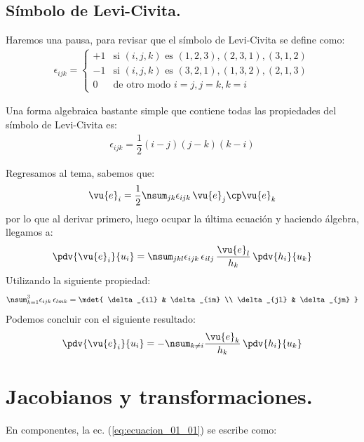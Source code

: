 \subsection*{Símbolo de Levi-Civita.}

Haremos una pausa, para revisar que el símbolo de Levi-Civita se define como:
\begin{align*}
\epsilon_{ijk} = \begin{cases}
+1 & \mbox{si } (i, j, k) \mbox{ es } (1, 2, 3), (2, 3, 1), (3, 1, 2) \\[0.5em]
-1 & \mbox{si } (i, j, k) \mbox{ es } (3, 2, 1), (1, 3, 2), (2, 1, 3) \\[0.5em]
0 & \mbox{de otro modo } i = j, j = k, k = i 
\end{cases}
\end{align*}

Una forma algebraica bastante simple que contiene todas las propiedades del símbolo de Levi-Civita es:
\begin{align*}
\epsilon_{ijk} = \dfrac{1}{2} (i - j) (j - k) (k - i)
\end{align*}

Regresamos al tema, sabemos que:
\begin{align*}
\vu{e}_{i} = \dfrac{1}{2} \nsum_{jk} \epsilon_{ijk} \, \vu{e}_{j} \cp \vu{e}_{k}
\end{align*}
por lo que al derivar primero, luego ocupar la última ecuación y haciendo álgebra, llegamos a:
\begin{align*}
\pdv{\vu{e}_{i}}{u_{i}} = \nsum_{jkl} \epsilon_{ijk} \, \epsilon_{ilj} \, \dfrac{\vu{e}_{l}}{h_{k}} \, \pdv{h_{i}}{u_{k}}
\end{align*}
Utilizando la siguiente propiedad:
\begin{align*}
\nsum_{k=1}^{3} \epsilon_{ijk} \, \epsilon_{lmk} = \mdet{
\delta_{il} & \delta_{im} \\
\delta_{jl} & \delta_{jm} }
\end{align*}
Podemos concluir con el siguiente resultado:
\begin{align*}
\pdv{\vu{e}_{i}}{u_{i}} = - \nsum_{k \neq i} \dfrac{\vu{e}_{k}}{h_{k}} \, \pdv{h_{i}}{u_k}
\end{align*}

\section{Jacobianos y transformaciones.}

En componentes, la ec. (\ref{eq:ecuacion_01_01}) se escribe como:

